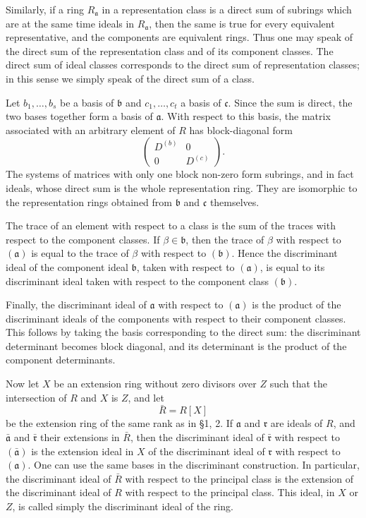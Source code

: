 \documentclass[
  12pt,
]{article}
\begin{document}
Similarly, if a ring \(R_{\mathfrak a}\) in a representation class is a
direct sum of subrings which are at the same time ideals in
\(R_{\mathfrak a}\), then the same is true for every equivalent
representative, and the components are equivalent rings. Thus one may
speak of the direct sum of the representation class and of its component
classes. The direct sum of ideal classes corresponds to the direct sum
of representation classes; in this sense we simply speak of the direct
sum of a class.

Let \(b_1,
\ldots,b_s\) be a basis of \(\mathfrak b\) and \(c_1,
\ldots,c_t\) a basis of \(\mathfrak c\). Since the sum is direct, the
two bases together form a basis of \(\mathfrak a\). With respect to this
basis, the matrix associated with an arbitrary element of \(R\) has
block-diagonal form \[
  \begin{pmatrix}D^{(b)}&0\\0&D^{(c)}\end{pmatrix}.
\] The systems of matrices with only one block non-zero form subrings,
and in fact ideals, whose direct sum is the whole representation ring.
They are isomorphic to the representation rings obtained from
\(\mathfrak b\) and \(\mathfrak c\) themselves.

The trace of an element with respect to a class is the sum of the traces
with respect to the component classes. If \(\beta\in\mathfrak b\), then
the trace of \(\beta\) with respect to \((\mathfrak a)\) is equal to the
trace of \(\beta\) with respect to \((\mathfrak b)\). Hence the
discriminant ideal of the component ideal \(\mathfrak b\), taken with
respect to \((\mathfrak a)\), is equal to its discriminant ideal taken
with respect to the component class \((\mathfrak b)\).

Finally, the discriminant ideal of \(\mathfrak a\) with respect to
\((\mathfrak a)\) is the product of the discriminant ideals of the
components with respect to their component classes. This follows by
taking the basis corresponding to the direct sum: the discriminant
determinant becomes block diagonal, and its determinant is the product
of the component determinants.

Now let \(X\) be an extension ring without zero divisors over \(Z\) such
that the intersection of \(R\) and \(X\) is \(Z\), and let \[
  \bar R=R[X]
\] be the extension ring of the same rank as in §1, 2. If
\(\mathfrak a\) and \(\mathfrak r\) are ideals of \(R\), and
\(\bar{\mathfrak a}\) and \(\bar{\mathfrak r}\) their extensions in
\(\bar R\), then the discriminant ideal of \(\bar{\mathfrak r}\) with
respect to \((\bar{\mathfrak a})\) is the extension ideal in \(X\) of
the discriminant ideal of \(\mathfrak r\) with respect to
\((\mathfrak a)\). One can use the same bases in the discriminant
construction. In particular, the discriminant ideal of \(\bar R\) with
respect to the principal class is the extension of the discriminant
ideal of \(R\) with respect to the principal class. This ideal, in \(X\)
or \(Z\), is called simply the discriminant ideal of the ring.
\end{document}
